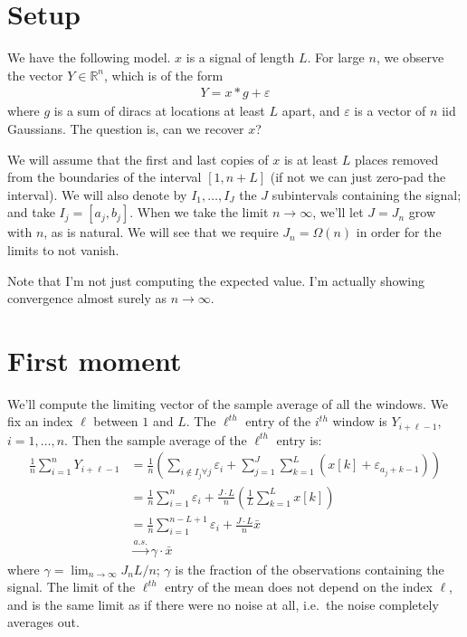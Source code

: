 \documentclass{article}
\theoremstyle{thm}
\theoremstyle{definition}
\newcommand{\ep}{\varepsilon}
\begin{document}
\section{Setup}

We have the following model. $x$ is a signal of length $L$. For large $n$, we observe the vector $Y \in \mathbb{R}^n$, which is of the form 
%
\begin{align}
%
    Y = x \ast g + \ep
%
\end{align}
%
where $g$ is a sum of diracs at locations at least $L$ apart, and $\ep$ is a vector of $n$ iid Gaussians. The question is, can we recover $x$? 

We will assume that the first and last copies of $x$ is at least $L$ places removed from the boundaries of the interval $[1,n + L]$ (if not we can just zero-pad the interval). We will also denote by $I_1,\dots,I_J$ the $J$ subintervals containing the signal; and take $I_j = [a_j,b_j]$. When we take the limit $n \to \infty$, we'll let $J = J_n$ grow with $n$, as is natural. We will see that we require $J_n = \Omega(n)$ in order for the limits to not vanish.

Note that I'm not just computing the expected value. I'm actually showing convergence almost surely as $n \to \infty$.


%
%
%

\section{First moment}

We'll compute the limiting vector of the sample average of all the windows. We fix an index $\ell$ between $1$ and $L$. The $\ell^{th}$ entry of the $i^{th}$ window is $Y_{i+\ell-1}$, $i=1,\dots,n$. Then the sample average of the $\ell^{th}$ entry is:
%
\begin{align}
%
    \frac{1}{n} \sum_{i=1}^n Y_{i+\ell - 1} &=
    \frac{1}{n}  \left( \sum_{i \notin I_j \forall j} \ep_i 
                  + \sum_{j=1}^J \sum_{k=1}^L (x[k] + \ep_{a_j + k-1} ) \right) 
    \nonumber \\
%
        &= \frac{1}{n}\sum_{i=1}^{n} \ep_i 
                  + \frac{J \cdot L}{n} \left(\frac{1}{L} \sum_{k=1}^L x[k]\right) 
    \nonumber \\
        &= \frac{1}{n}\sum_{i=1}^{n-L+1} \ep_i 
                  + \frac{J \cdot L}{n} \bar{x}       
     \nonumber \\
%
        &\operatorname*{\longrightarrow}^{a.s.}  \gamma  \cdot \bar{x}
%
\end{align}
%
where $\gamma = \lim_{n\to\infty} J_n L / n$; $\gamma$ is the fraction of the observations containing the signal. The limit of the $\ell^{th}$ entry of the mean does not depend on the index $\ell$, and is the same limit as if there were no noise at all, i.e.\ the noise completely averages out.
\end{document}
